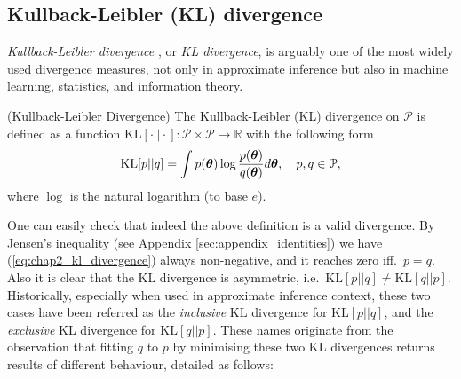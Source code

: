\subsection{Kullback-Leibler (KL) divergence}
\label{sec:chap2_kl_divergence}
\emph{Kullback-Leibler divergence} \citep{kullback:divergence1951, kullback:information1959}, or \emph{KL divergence}, is arguably one of the most widely used divergence measures, not only in approximate inference but also in machine learning, statistics, and information theory. 
%
\begin{definition}
(Kullback-Leibler Divergence)
The Kullback-Leibler (KL) divergence on $\mathcal{P}$ is defined as a function $\mathrm{KL}[\cdot || \cdot]: \mathcal{P} \times \mathcal{P} \rightarrow \mathbb{R}$ with the following form
\begin{equation}
\mathrm{KL}[p||q] = \int p(\bm{\theta}) \log \frac{p(\bm{\theta})}{q(\bm{\theta})} d\bm{\theta}, \quad p, q \in \mathcal{P},
\label{eq:chap2_kl_divergence}
\end{equation}
where $\log$ is the natural logarithm (to base $e$).
\label{def:chap2_kl_divergence}
\end{definition}
One can easily check that indeed the above definition is a valid divergence. By Jensen's inequality (see Appendix \ref{sec:appendix_identities}) we have (\ref{eq:chap2_kl_divergence}) always non-negative, and it reaches zero iff.~$p = q$. Also it is clear that the KL divergence is asymmetric, i.e.~$\mathrm{KL}[p||q] \neq \mathrm{KL}[q||p]$. 
%
Historically, especially when used in approximate inference context, these two cases have been referred as the \emph{inclusive} KL divergence for $\mathrm{KL}[p||q]$, and the \emph{exclusive} KL divergence for $\mathrm{KL}[q||p]$. These names originate from the observation that fitting $q$ to $p$ by minimising these two KL divergences returns results of different behaviour, detailed as follows:
%
